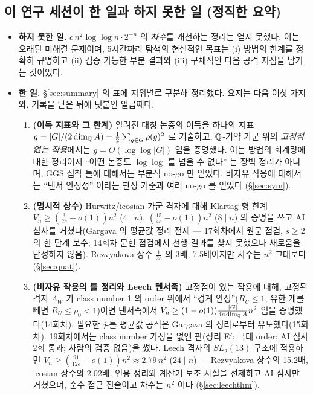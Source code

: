 \subsection{이 연구 세션이 한 일과 하지 못한 일 (정직한 요약)}
\begin{itemize}
\item \textbf{하지 못한 일.} $c\,n^2\log\log n\cdot 2^{-n}$ 의 \emph{차수}를 개선하는 정리는 얻지 못했다. 이는 오래된 미해결 문제이며, 5시간짜리 탐색의 현실적인 목표는 (i) 방법의 한계를 정확히 규명하고 (ii) 검증 가능한 부분 결과와 (iii) 구체적인 다음 공격 지점을 남기는 것이었다.
\item \textbf{한 일.} \S\ref{sec:summary} 의 표에 지위별로 구분해 정리했다. 요지는 다음 여섯 가지와, 기록을 닫은 뒤에 덧붙인 일곱째다.
 \begin{enumerate}
 \item \textbf{(이득 지표와 그 한계)} 알려진 대칭 논증의 이득을 하나의 지표 $g=|G|/(2\dim_{\mathbb{Q}} A)=\tfrac12\sum_{g\in G}\rho(g)^2$ 로 기술하고, $\mathbb{Q}$-기약 가군 위의 \emph{고정점 없는 작용}에서는 $g=O(\log\log|G|)$ 임을 증명했다. 이는 방법의 회계량에 대한 정리이지 ``어떤 논증도 $\log\log$ 를 넘을 수 없다'' 는 장벽 정리가 아니며, GGS 접착 틀에 대해서는 부분적 no-go 만 얻었다. 비자유 작용에 대해서는 ``텐서 안정성'' 이라는 판정 기준과 여러 no-go 를 얻었다 (\S\ref{sec:sym}).
 \item \textbf{(명시적 상수)} Hurwitz/icosian 가군 격자에 대해 Klartag 형 한계 $V_n\ge(\tfrac3{2e}-o(1))n^2$ ($4\mid n$), $(\tfrac{15}{4e}-o(1))n^2$ ($8\mid n$) 의 증명을 쓰고 AI 심사를 거쳤다(Gargava 의 평균값 정리 전제 --- 17회차에서 원문 점검, $s\ge2$ 의 한 단계 보수; 14회차 문헌 점검에서 선행 결과를 찾지 못했으나 새로움을 단정하지 않음). Rezvyakova 상수 $\tfrac1{2e}$ 의 3배, 7.5배이지만 차수는 $n^2$ 그대로다 (\S\ref{sec:quat}).
 \item \textbf{(비자유 작용의 틀 정리와 Leech 텐서족)} 고정점이 있는 작용에 대해, 고정된 격자 $\Lambda_W$ 가 class number 1 의 order 위에서 ``경계 안정''($R_U\le1$, 유한 개를 빼면 $R_U\le\rho_0<1$)이면 텐서족에서 $V_n\ge(1-o(1))\tfrac{|G|}{4e\dim_{\mathbb{Q}} A}n^2$ 임을 증명했다(14회차). 필요한 $j$-틀 평균값 공식은 Gargava 의 정리로부터 유도했다(15회차). 19회차에서는 class number 가정을 없앤 판(정리 E$'$; 극대 order; AI 심사 2회 통과; 사람의 검증 없음)을 썼다. Leech 격자의 $SL_2(13)$ 구조에 적용하면 $V_n\ge(\tfrac{91}{12e}-o(1))n^2\approx2.79\,n^2$ ($24\mid n$) --- Rezvyakova 상수의 15.2배, icosian 상수의 2.02배. 인용 정리와 계산기 보조 사실을 전제하고 AI 심사만 거쳤으며, 순수 점근 진술이고 차수는 $n^2$ 이다 (\S\ref{sec:leechthm}).

\end{enumerate}
\end{itemize}
